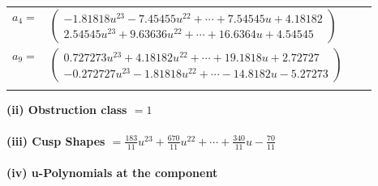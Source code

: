 \documentclass[1p]{elsarticle_modified}
\theoremstyle{definition}
\begin{document}
\begin{tabular}{m{7pt} m{180pt} m{7pt} m{180pt} }
\flushright $a_{4}=$&$\begin{pmatrix}-1.81818 u^{23}-7.45455 u^{22}+\cdots+7.54545 u+4.18182\\2.54545 u^{23}+9.63636 u^{22}+\cdots+16.6364 u+4.54545\end{pmatrix}$ \\
\flushright $a_{9}=$&$\begin{pmatrix}0.727273 u^{23}+4.18182 u^{22}+\cdots+19.1818 u+2.72727\\-0.272727 u^{23}-1.81818 u^{22}+\cdots-14.8182 u-5.27273\end{pmatrix}$\\&\end{tabular}
\flushleft \textbf{(ii) Obstruction class $= 1$}\\~\\
\flushleft \textbf{(iii) Cusp Shapes $= \frac{183}{11} u^{23}+\frac{670}{11} u^{22}+\cdots+\frac{340}{11} u-\frac{70}{11}$}\\~\\
\newpage\renewcommand{\arraystretch}{1}
\flushleft \textbf{(iv) u-Polynomials at the component}\newline \\
\end{document}
